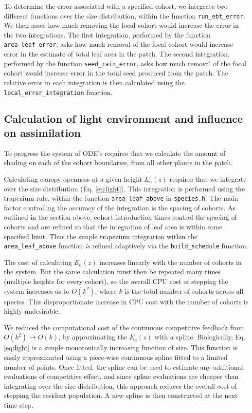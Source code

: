 \documentclass[10pt,twoside]{article}
\begin{document}
To determine the error associated with a specified cohort, we integrate
two different functions over the size distribution, within the function
\texttt{run\_ebt\_error}. We then asses how much removing the focal
cohort would increase the error in the two integrations. The first
integration, performed by the function \texttt{area\_leaf\_error}, asks
how much removal of the focal cohort would increase error in the
estimate of total leaf area in the patch. The second integration,
performed by the function \texttt{seed\_rain\_error}, asks how much
removal of the focal cohort would increase error in the total seed
produced from the patch. The relative error in each integration is then
calculated using the \texttt{local\_error\_integration} function.

\subsection{Calculation of light environment and influence on
assimilation}\label{calculation-of-light-environment-and-influence-on-assimilation}

To progress the system of ODE's requires that we calculate the amount of
shading on each of the cohort boundaries, from all other plants in the
patch.

Calculating canopy openness at a given height \(E_a(z)\) requires that
we integrate over the size distribution (Eq. \ref{eq:light}). This
integration is performed using the trapezium rule, within the function
\texttt{area\_leaf\_above} in \texttt{species.h}. The main factor
controlling the accuracy of the integration is the spacing of cohorts.
As outlined in the section above, cohort introduction times control the
spacing of cohorts and are refined so that the integration of leaf area
is within some specified limit. Thus the simple trapezium integration
within the \texttt{area\_leaf\_above} function \emph{is} refined
adaptively via the \texttt{build\_schedule} function.

The cost of calculating \(E_a(z)\) increases linearly with the number of
cohorts in the system. But the same calculation must then be repeated
many times (multiple heights for every cohort), so the overall CPU cost
of stepping the system increases as to \(O(k^2)\), where \(k\) is the
total number of cohorts across all species. This disproportionate
increase in CPU cost with the number of cohorts is highly undesirable.

We reduced the computational cost of the continuous competitive feedback
from \(O(k^2) \rightarrow O(k)\), by approximating the \(E_a(z)\) with a
spline. Biologically, Eq. \ref{eq:light} is a simple monotonically
increasing function of size. This function is easily
approximated using a piece-wise continuous spline fitted to a limited
number of points. Once fitted, the spline can be used to estimate any
additional evaluations of competitive effect, and since spline
evaluations are cheaper than integrating over the size distribution,
this approach reduces the overall cost of stepping the resident
population. A new spline is then constructed at the next time step.
\end{document}
